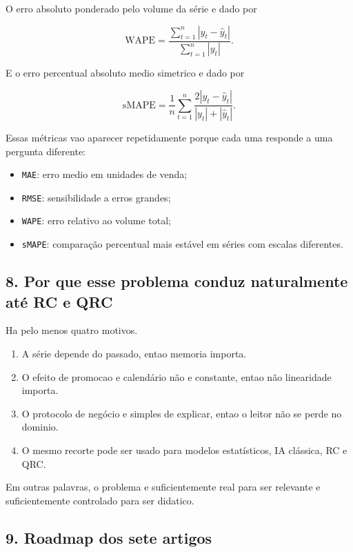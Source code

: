 \documentclass[12pt]{article}
\providecommand{\tightlist}{%
          \setlength{\itemsep}{0pt}\setlength{\parskip}{0pt}}
\begin{document}
O erro absoluto ponderado pelo volume da série e dado por

\[
\mathrm{WAPE} = \frac{\sum_{t=1}^n |y_t - \hat{y}_t|}{\sum_{t=1}^n |y_t|}.
\]

E o erro percentual absoluto medio simetrico e dado por

\[
\mathrm{sMAPE} = \frac{1}{n} \sum_{t=1}^n
\frac{2 |y_t - \hat{y}_t|}{|y_t| + |\hat{y}_t|}.
\]

Essas métricas vao aparecer repetidamente porque cada uma responde a uma pergunta diferente:

\begin{itemize}
\tightlist
\item
  \texttt{MAE}: erro medio em unidades de venda;
\item
  \texttt{RMSE}: sensibilidade a erros grandes;
\item
  \texttt{WAPE}: erro relativo ao volume total;
\item
  \texttt{sMAPE}: comparação percentual mais estável em séries com escalas diferentes.
\end{itemize}

\subsection{8. Por que esse problema conduz naturalmente até RC e QRC}\label{8-por-que-esse-problema-conduz-naturalmente-atuxe9-rc-e-qrc}

Ha pelo menos quatro motivos.

\begin{enumerate}
\def\labelenumi{\arabic{enumi}.}
\tightlist
\item
  A série depende do passado, entao memoria importa.
\item
  O efeito de promocao e calendário não e constante, entao não linearidade importa.
\item
  O protocolo de negócio e simples de explicar, entao o leitor não se perde no dominio.
\item
  O mesmo recorte pode ser usado para modelos estatísticos, IA clássica, RC e QRC.
\end{enumerate}

Em outras palavras, o problema e suficientemente real para ser relevante e suficientemente controlado para ser didatico.

\subsection{9. Roadmap dos sete artigos}\label{9-roadmap-dos-sete-artigos}
\end{document}
